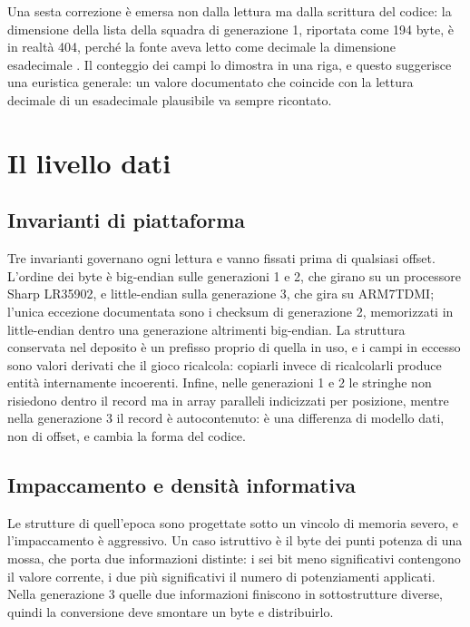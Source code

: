 \documentclass[11pt,a4paper]{article}
\begin{document}
Una sesta correzione è emersa non dalla lettura ma dalla scrittura del codice: la dimensione della lista della squadra di generazione 1, riportata come 194 byte, è in realtà 404, perché la fonte aveva letto come decimale la dimensione esadecimale . Il conteggio dei campi lo dimostra in una riga, e questo suggerisce una euristica generale: un valore documentato che coincide con la lettura decimale di un esadecimale plausibile va sempre ricontato.

\section{Il livello dati}

\subsection{Invarianti di piattaforma}

Tre invarianti governano ogni lettura e vanno fissati prima di qualsiasi offset. L'ordine dei byte è big-endian sulle generazioni 1 e 2, che girano su un processore Sharp LR35902, e little-endian sulla generazione 3, che gira su ARM7TDMI; l'unica eccezione documentata sono i checksum di generazione 2, memorizzati in little-endian dentro una generazione altrimenti big-endian. La struttura conservata nel deposito è un prefisso proprio di quella in uso, e i campi in eccesso sono valori derivati che il gioco ricalcola: copiarli invece di ricalcolarli produce entità internamente incoerenti. Infine, nelle generazioni 1 e 2 le stringhe non risiedono dentro il record ma in array paralleli indicizzati per posizione, mentre nella generazione 3 il record è autocontenuto: è una differenza di modello dati, non di offset, e cambia la forma del codice.

\subsection{Impaccamento e densità informativa}

Le strutture di quell'epoca sono progettate sotto un vincolo di memoria severo, e l'impaccamento è aggressivo. Un caso istruttivo è il byte dei punti potenza di una mossa, che porta due informazioni distinte: i sei bit meno significativi contengono il valore corrente, i due più significativi il numero di potenziamenti applicati. Nella generazione 3 quelle due informazioni finiscono in sottostrutture diverse, quindi la conversione deve smontare un byte e distribuirlo.
\end{document}
